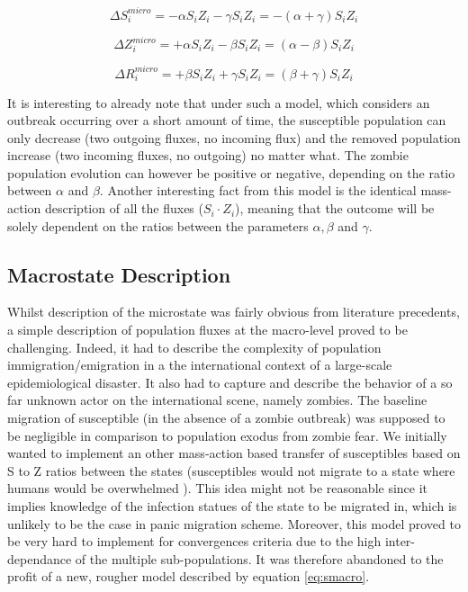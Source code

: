 \documentclass[11pt]{article} %
\begin{document}
\begin{equation}  \label{eq:smicro}
\Delta S_{i}^{micro} = -\alpha S_{i} Z_{i} -\gamma S_{i} Z_{i} = -(\alpha + \gamma) S_{i} Z_{i}
\end{equation}

\begin{equation} \label{eq:zmicro}
\Delta Z_{i}^{micro} = +\alpha S_{i} Z_{i} - \beta S_{i} Z_{i} = (\alpha - \beta) S_{i} Z_{i}
\end{equation}

\begin{equation} \label{eq:rmicro}
\Delta R_{i}^{micro} = +\beta S_{i} Z_{i} + \gamma S_{i} Z_{i} = (\beta + \gamma) S_{i} Z_{i}
\end{equation}
\bigskip

It is interesting to already note that under such a model, which considers an outbreak occurring over a short amount of time, the susceptible population can only decrease (two outgoing fluxes, no incoming flux) and the removed population increase (two incoming fluxes, no outgoing) no matter what. The zombie population evolution can however be positive or negative, depending on the ratio between $\alpha$ and $\beta$. Another interesting fact from this model is the identical mass-action description of all the fluxes ($S_{i} \cdot Z_{i}$), meaning that the outcome will be solely dependent on the ratios between the parameters $\alpha, \beta$ and $\gamma$.

\subsection{Macrostate Description}\indent

Whilst description of the microstate was fairly obvious from literature precedents, a simple description of population fluxes at the macro-level proved to be challenging. Indeed, it had to describe the complexity of population immigration/emigration in a the international context of a large-scale epidemiological disaster. It also had to capture and describe the behavior of a so far unknown actor on the international scene, namely zombies. The baseline migration of susceptible (in the absence of a zombie outbreak) was supposed to be negligible in comparison to population exodus from zombie fear. We initially wanted to implement an other mass-action based transfer of susceptibles based on S to Z ratios between the states (susceptibles would not migrate to a state where humans would be overwhelmed ). This idea might not be reasonable since it implies knowledge of the infection statues of the state to be migrated in, which is unlikely to be the case in panic migration scheme. Moreover, this model proved to be very hard to implement for convergences criteria due to the high inter-dependance of the multiple sub-populations. It was therefore abandoned to the profit of a new, rougher model described by equation \eqref{eq:smacro}. 
\end{document}
